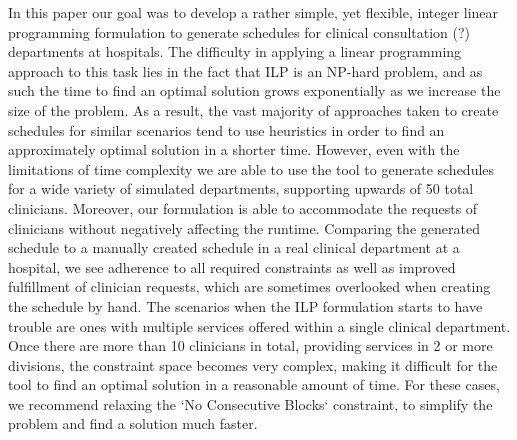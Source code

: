 In this paper our goal was to develop a rather simple, yet flexible, integer linear programming formulation to generate schedules for clinical consultation (?) departments at hospitals. The difficulty in applying a linear programming approach to this task lies in the fact that ILP is an NP-hard problem, and as such the time to find an optimal solution grows exponentially as we increase the size of the problem. As a result, the vast majority of approaches taken to create schedules for similar scenarios tend to use heuristics in order to find an approximately optimal solution in a shorter time. However, even with the limitations of time complexity we are able to use the tool to generate schedules for a wide variety of simulated departments, supporting upwards of 50 total clinicians. Moreover, our formulation is able to accommodate the requests of clinicians without negatively affecting the runtime. Comparing the generated schedule to a manually created schedule in a real clinical department at a hospital, we see adherence to all required constraints as well as improved fulfillment of clinician requests, which are sometimes overlooked when creating the schedule by hand. The scenarios when the ILP formulation starts to have trouble are ones with multiple services offered within a single clinical department. Once there are more than 10 clinicians in total, providing services in 2 or more divisions, the constraint space becomes very complex, making it difficult for the tool to find an optimal solution in a reasonable amount of time. For these cases, we recommend relaxing the `No Consecutive Blocks` constraint, to simplify the problem and find a solution much faster.